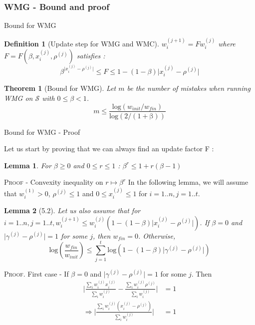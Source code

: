 \documentclass{beamer}
\newtheorem{Lm}{Lemma}
\newtheorem{Th}{Theorem}
\newtheorem{Def}{Definition}
\begin{document}
			\subsubsection*{WMG - Bound and proof}

\begin{frame}{Bound for WMG}

\begin{Def}[Update step for WMG and WMC]
$w_i^{(j+1)} = F w_i^{(j)}$ where $F = F(\beta,x_i^{(j)},\rho^{(j)})$ satisfies : 
\[\beta^{\lvert x_i^{(j)} - \rho^{(j)} \rvert} \leq F \leq 1-(1-\beta)\lvert x_i^{(j)} - \rho^{(j)} \rvert\] 
\end{Def}

\begin{Th}[Bound for WMG]
Let $m$ be the number of mistakes when running WMG on $\mathcal{S}$ with $0 \leq \beta <1$.
\[m \leq \frac{\mathrm{log}(w_{init}/w_{fin})}{\mathrm{log(2/(1+\beta))}}\]
\end{Th}

\end{frame}
		
\begin{frame}{Bound for WMG - Proof}

Let us start by proving that we can always find an update factor F :
\begin{Lm}
For $\beta \geq 0$ and $0 \leq r \leq 1$ : $\beta^r\leq 1 + r(\beta - 1)$
\end{Lm}
\textsc{Proof} - Convexity inequality on $r \mapsto \beta^r$\newline
In the following lemma, we will assume that $w_i^{(1)}>0$, $\rho^{(j)}\leq 1$ and $0\leq x_i^{(j)}\leq 1$ for $i=1..n, j=1..t$. 

\end{frame}

\begin{frame}

\begin{Lm}[5.2]
Let us also assume that for $i=1..n, j=1..t, w_i^{(j+1)}\leq w_i^{(j)}(1-(1-\beta)\lvert x_i^{(j)}-\rho^{(j)}\rvert)$. If $\beta=0$ and $\lvert \gamma^{(j)}-\rho^{(j)}\rvert=1$ for some $j$, then $w_{fin} = 0$. Otherwise,
\[\mathrm{log}(\frac{w_{fin}}{w_{init}})\leq\sum_{j=1}^{t}\mathrm{log}(1-(1-\beta)\lvert \gamma^{(j)}-\rho^{(j)}\rvert)\]
\end{Lm}
\textsc{Proof}.\newline
First case - If $\beta=0$ and $\lvert \gamma^{(j)}-\rho^{(j)}\rvert=1$ for some $j$. Then 
\begin{align*}
\lvert \frac{\sum_i w_i^{(j)}x_i^{(j)}}{\sum_i w_i^{(j)}} - \frac{\sum_i w_i^{(j)}\rho^{(j)}}{\sum_i w_i^{(j)}} \rvert &= 1\\
\Rightarrow\lvert \frac{\sum_i w_i^{(j)}(x_i^{(j)} - \rho^{(j)})}{\sum_i w_i^{(j)}} \rvert &= 1\\
\end{align*}

\end{frame}
\end{document}
